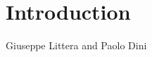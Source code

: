 \chapter{Introduction}
\label{ch:Introduction}

\vspace{-1cm}
\begin{center}
Giuseppe Littera and Paolo Dini
\end{center}







\newpage
